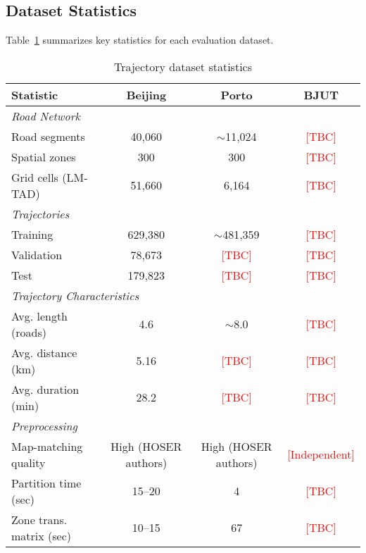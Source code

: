 \subsection{Dataset Statistics}
\label{sec:data-stats}

Table~\ref{tab:dataset-stats} summarizes key statistics for each evaluation dataset.

\begin{table}[h]
\centering
\caption{Trajectory dataset statistics}
\label{tab:dataset-stats}
\small
\begin{tabular}{lccc}
\toprule
\textbf{Statistic} & \textbf{Beijing} & \textbf{Porto} & \textbf{BJUT} \\
\midrule
\multicolumn{4}{l}{\textit{Road Network}} \\
\quad Road segments & 40,060 & $\sim$11,024 & \textcolor{red}{[TBC]} \\
\quad Spatial zones & 300 & 300 & \textcolor{red}{[TBC]} \\
\quad Grid cells (LM-TAD) & 51,660 & 6,164 & \textcolor{red}{[TBC]} \\
\midrule
\multicolumn{4}{l}{\textit{Trajectories}} \\
\quad Training & 629,380 & $\sim$481,359 & \textcolor{red}{[TBC]} \\
\quad Validation & 78,673 & \textcolor{red}{[TBC]} & \textcolor{red}{[TBC]} \\
\quad Test & 179,823 & \textcolor{red}{[TBC]} & \textcolor{red}{[TBC]} \\
\midrule
\multicolumn{4}{l}{\textit{Trajectory Characteristics}} \\
\quad Avg. length (roads) & 4.6 & $\sim$8.0 & \textcolor{red}{[TBC]} \\
\quad Avg. distance (km) & 5.16 & \textcolor{red}{[TBC]} & \textcolor{red}{[TBC]} \\
\quad Avg. duration (min) & 28.2 & \textcolor{red}{[TBC]} & \textcolor{red}{[TBC]} \\
\midrule
\multicolumn{4}{l}{\textit{Preprocessing}} \\
\quad Map-matching quality & High (HOSER authors) & High (HOSER authors) & \textcolor{red}{[Independent]} \\
\quad Partition time (sec) & 15--20 & 4 & \textcolor{red}{[TBC]} \\
\quad Zone trans. matrix (sec) & 10--15 & 67 & \textcolor{red}{[TBC]} \\
\bottomrule
\end{tabular}
\end{table}

